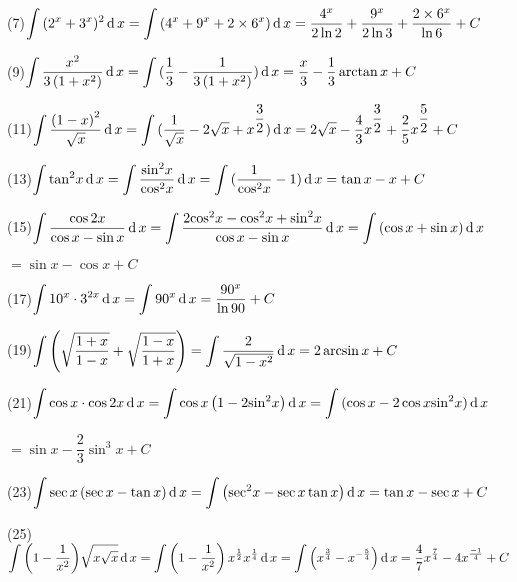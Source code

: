 (7)$\displaystyle\int {({2^x} + {3^x}} {)^2}\operatorname{\mathop{}\!\mathrm{d}} x = \displaystyle\int {({4^x} + {9^x} + 2 \times {6^x}} )\operatorname{\mathop{}\!\mathrm{d}} x = \dfrac{{{4^x}}}{{2\ln 2}} + \dfrac{{{9^x}}}{{2\ln 3}} + \dfrac{{2 \times {6^x}}}{{\ln 6}} + C$

(9)$\displaystyle\int {\dfrac{{{x^2}}}{{3\left( {1 + {x^2}} \right)}}} \operatorname{\mathop{}\!\mathrm{d}} x = \displaystyle\int {(\dfrac{1}{3}}  - \dfrac{1}{{3\left( {1 + {x^2}} \right)}})\operatorname{\mathop{}\!\mathrm{d}} x = \dfrac{x}{3} - \dfrac{1}{3}\arctan x + C$

(11)$\displaystyle\int {\dfrac{{{{(1 - x)}^2}}}{{\sqrt x }}\operatorname{\mathop{}\!\mathrm{d}}x}  = \displaystyle\int {(\dfrac{1}{{\sqrt x }} - 2\sqrt x  + {x^{\dfrac{3}{2}}})\operatorname{\mathop{}\!\mathrm{d}}x}  = 2\sqrt x  - \dfrac{4}{3}{x^{\dfrac{3}{2}}} + \dfrac{2}{5}{x^{\dfrac{5}{2}}} + C$

(13)$\displaystyle\int {{{\tan }^2}x\operatorname{\mathop{}\!\mathrm{d}}x}  = \displaystyle\int {\dfrac{{{{\sin }^2}x}}{{{{\cos }^2}x}}} \operatorname{\mathop{}\!\mathrm{d}} x = \displaystyle\int {(\dfrac{1}{{{{\cos }^2}x}}}  - 1)\operatorname{\mathop{}\!\mathrm{d}} x = \tan x - x + C$

(15)$\displaystyle\int {\dfrac{{\cos 2x}}{{\cos x - \sin x}}} \operatorname{\mathop{}\!\mathrm{d}} x = \displaystyle\int {\dfrac{{2{{\cos }^2}x - {{\cos }^2}x + {{\sin }^2}x}}{{\cos x - \sin x}}} \operatorname{\mathop{}\!\mathrm{d}} x = \displaystyle\int {(\cos x + \sin x)\operatorname{\mathop{}\!\mathrm{d}}x} $

$ = \sin x - \cos x + C$

(17)$\displaystyle\int {{{10}^x} \cdot {3^{2x}}\operatorname{\mathop{}\!\mathrm{d}}x}  = \displaystyle\int {{{90}^x}\operatorname{\mathop{}\!\mathrm{d}}x}  = \dfrac{{{{90}^x}}}{{\ln 90}} + C$

(19)$\displaystyle\int {\left( {\sqrt {\dfrac{{1 + x}}{{1 - x}}}  + \sqrt {\dfrac{{1 - x}}{{1 + x}}} } \right)}  = \displaystyle\int {\dfrac{2}{{\sqrt {1 - {x^2}} }}} \operatorname{\mathop{}\!\mathrm{d}} x = 2\arcsin x + C$

(21)$\displaystyle\int {\cos x \cdot \cos 2x\operatorname{\mathop{}\!\mathrm{d}}x = \displaystyle\int {\cos x\left( {1 - 2{{\sin }^2}x} \right)} } \operatorname{\mathop{}\!\mathrm{d}} x = \displaystyle\int {(\cos x}  - 2\cos x{\sin ^2}x)\operatorname{\mathop{}\!\mathrm{d}} x$

$ = \sin x - \dfrac{2}{3}{\sin ^3}x + C$

(23)$\displaystyle\int {\sec x\left( {\sec x - \tan x} \right)} \operatorname{\mathop{}\!\mathrm{d}} x = \displaystyle\int {\left( {{{\sec }^2}x - \sec x\tan x} \right)\operatorname{\mathop{}\!\mathrm{d}}x}  = \tan x - \sec x + C$

(25)$\displaystyle\int {\left( {1 - \dfrac{1}{{{x^2}}}} \right)} \sqrt {x\sqrt x } \operatorname{\mathop{}\!\mathrm{d}} x = \displaystyle\int {\left( {1 - \dfrac{1}{{{x^2}}}} \right){x^{\frac{1}{2}}}} {x^{\frac{1}{4}}}\operatorname{\mathop{}\!\mathrm{d}} x = \displaystyle\int {\left( {{x^{\frac{3}{4}}} - {x^{ - \frac{5}{4}}}} \right)} \operatorname{\mathop{}\!\mathrm{d}} x = \dfrac{4}{7}{x^{\frac{7}{4}}} - 4{x^{\frac{{ - 1}}{4}}} + C$

